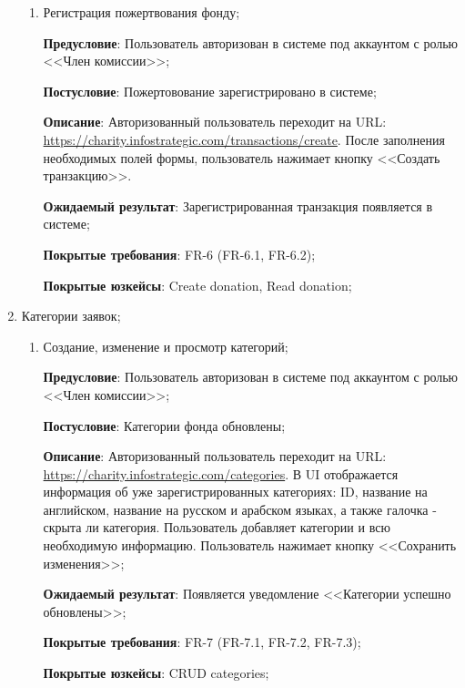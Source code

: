\begin{enumerate}
    \begin{enumerate}
        \item Регистрация пожертвования фонду;
        
        \textbf{Предусловие}: Пользователь авторизован в системе под аккаунтом с ролью <<Член комиссии>>;
        
        \textbf{Постусловие}: Пожертовование зарегистрировано в системе;
        
        \textbf{Описание}: Авторизованный пользователь переходит на URL: \url{https://charity.infostrategic.com/transactions/create}. После заполнения необходимых полей формы, пользователь нажимает кнопку <<Создать транзакцию>>. 
        
        \textbf{Ожидаемый результат}: Зарегистрированная транзакция появляется в системе;
        
        \textbf{Покрытые требования}: FR-6 (FR-6.1, FR-6.2);
        
        \textbf{Покрытые юзкейсы}: Create donation, Read donation;
    \end{enumerate}
    
    \item Категории заявок;
    
    \begin{enumerate}
        \item Создание, изменение и просмотр категорий;
        
        \textbf{Предусловие}: Пользователь авторизован в системе под аккаунтом с ролью <<Член комиссии>>;
        
        \textbf{Постусловие}: Категории фонда обновлены;
        
        \textbf{Описание}: Авторизованный пользователь переходит на URL: \url{https://charity.infostrategic.com/categories}. В UI отображается информация об уже зарегистрированных категориях: ID, название на английском, название на русском и арабском языках, а также галочка - скрыта ли категория. Пользователь добавляет категории и всю необходимую информацию. Пользователь нажимает кнопку <<Сохранить изменения>>;
        
        \textbf{Ожидаемый результат}: Появляется уведомление <<Категории успешно обновлены>>;
        
        \textbf{Покрытые требования}: FR-7 (FR-7.1, FR-7.2, FR-7.3);
        
        \textbf{Покрытые юзкейсы}: CRUD categories;
    \end{enumerate}
    

\end{enumerate}
